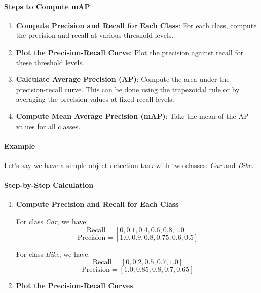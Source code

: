 \documentclass[12pt]{article}
\begin{document}
\paragraph{Steps to Compute mAP}

\begin{enumerate}
  \item \textbf{Compute Precision and Recall for Each Class}: For each class, compute the precision and recall at various threshold levels.
  \item \textbf{Plot the Precision-Recall Curve}: Plot the precision against recall for these threshold levels.
  \item \textbf{Calculate Average Precision (AP)}: Compute the area under the precision-recall curve. This can be done using the trapezoidal rule or by averaging the precision values at fixed recall levels.
  \item \textbf{Compute Mean Average Precision (mAP)}: Take the mean of the AP values for all classes.
\end{enumerate}

\paragraph{Example}

Let's say we have a simple object detection task with two classes: \textit{Car} and \textit{Bike}.

\paragraph{Step-by-Step Calculation}

\begin{enumerate}
  \item \textbf{Compute Precision and Recall for Each Class}

  For class \textit{Car}, we have:
  \[
  \text{Recall} = [0, 0.1, 0.4, 0.6, 0.8, 1.0]
  \]
  \[
  \text{Precision} = [1.0, 0.9, 0.8, 0.75, 0.6, 0.5]
  \]

  For class \textit{Bike}, we have:
  \[
  \text{Recall} = [0, 0.2, 0.5, 0.7, 1.0]
  \]
  \[
  \text{Precision} = [1.0, 0.85, 0.8, 0.7, 0.65]
  \]

  \item \textbf{Plot the Precision-Recall Curves}
\end{enumerate}
\end{document}
